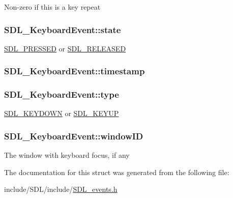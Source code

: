 Non-\/zero if this is a key repeat \hypertarget{struct_s_d_l___keyboard_event_a110558eb96c113c86cfa31a7018c2346}{
\subsubsection[{state}]{ S\-D\-L\-\_\-\-Keyboard\-Event\-::state}}\label{struct_s_d_l___keyboard_event_a110558eb96c113c86cfa31a7018c2346}
\hyperlink{_s_d_l__events_8h_aee81bbffbc8489bdea8fecd1232c4bd1}{S\-D\-L\-\_\-\-P\-R\-E\-S\-S\-E\-D} or \hyperlink{_s_d_l__events_8h_ad680a069f9fcab80de91b3eefdf29c3c}{S\-D\-L\-\_\-\-R\-E\-L\-E\-A\-S\-E\-D} \hypertarget{struct_s_d_l___keyboard_event_a3da1d8f6892e7f6ee28d9eafdb5e7d02}{
\subsubsection[{timestamp}]{ S\-D\-L\-\_\-\-Keyboard\-Event\-::timestamp}}\label{struct_s_d_l___keyboard_event_a3da1d8f6892e7f6ee28d9eafdb5e7d02}
\hypertarget{struct_s_d_l___keyboard_event_ae0b2f2aace6f80c1f47e5a14350d409a}{
\subsubsection[{type}]{ S\-D\-L\-\_\-\-Keyboard\-Event\-::type}}\label{struct_s_d_l___keyboard_event_ae0b2f2aace6f80c1f47e5a14350d409a}
\hyperlink{_s_d_l__events_8h_a3b589e89be6b35c02e0dd34a55f3fccaacaf8cfd53c985cdbf6a90c811d51a1fc}{S\-D\-L\-\_\-\-K\-E\-Y\-D\-O\-W\-N} or \hyperlink{_s_d_l__events_8h_a3b589e89be6b35c02e0dd34a55f3fccaadefb8866b9d28be21c2c33c35cc66c4b}{S\-D\-L\-\_\-\-K\-E\-Y\-U\-P} \hypertarget{struct_s_d_l___keyboard_event_a56efb6780b96acd5b50d8f797efb3546}{
\subsubsection[{window\-I\-D}]{ S\-D\-L\-\_\-\-Keyboard\-Event\-::window\-I\-D}}\label{struct_s_d_l___keyboard_event_a56efb6780b96acd5b50d8f797efb3546}
The window with keyboard focus, if any 

The documentation for this struct was generated from the following file\-:\begin{DoxyCompactItemize}
\item 
include/\-S\-D\-L/include/\hyperlink{_s_d_l__events_8h}{S\-D\-L\-\_\-events.\-h}\end{DoxyCompactItemize}
